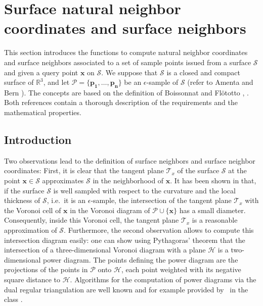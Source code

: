 \section{Surface natural neighbor coordinates and surface neighbors}\label{sec:surface}

This section introduces the functions to compute natural neighbor
coordinates and surface neighbors associated to a set of sample points
issued from a surface $\mathcal{S}$ and given a query point
$\mathbf{x}$ on $\mathcal{S}$. We suppose that $\mathcal{S}$ is a
closed and compact surface of $\mathbb{R}^3$, and let $\mathcal{P}=
\{\mathbf{p_1}, \ldots,\mathbf{p_n}\}$ be an $\epsilon$-sample of
$\mathcal{S}$ (refer to Amenta and Bern \cite{ab-srvf-99}). The
concepts are based on the definition of Boissonnat and Fl\"ototto
\cite{bf-lcss-02}, \cite{cgal:f-csapc-03}.  Both references
contain a thorough description of the requirements and the
mathematical properties.

\subsection{Introduction}

Two observations lead to the definition of surface neighbors and
surface neighbor coordinates: First, it is clear that the tangent
plane $\mathcal{T}_x$ of the surface $\mathcal{S}$ at the point
$\mathbf{x} \in \mathcal{S}$ approximates $\mathcal{S}$ in the
neighborhood of $\mathbf{x}$. It has been shown in \cite{bf-lcss-02}
that, if the surface $\mathcal{S}$ is well sampled with respect to the
curvature and the local thickness of $\mathcal{S}$, i.e.\ it is an $\epsilon$-sample, the intersection
of the tangent plane $\mathcal{T}_x$ with the Voronoi cell of
$\mathbf{x}$ in the Voronoi diagram of $\mathcal{P} \cup
\{\mathbf{x}\}$ has a small diameter.  Consequently, inside this
Voronoi cell, the tangent plane $\mathcal{T}_x$ is a reasonable
approximation of $\mathcal{S}$. Furthermore, the second observation
allows to compute this intersection diagram easily: one can show using
Pythagoras' theorem that the intersection of a three-dimensional
Voronoi diagram with a plane $\mathcal{H}$ is a two-dimensional power
diagram. The points defining the power diagram are the projections of
the points in $\mathcal{P}$ onto $\mathcal{H}$, each point weighted
with its negative square distance to $\mathcal{H}$. Algorithms for the
computation of power diagrams via the dual regular triangulation are
well known and for example provided by \cgal\ in the class
.

